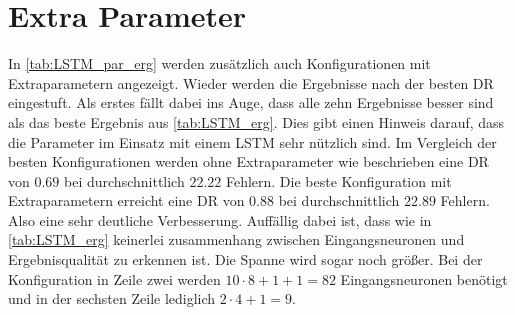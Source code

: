 \section{Extra Parameter}\label{sec:erg_LSTM_extra}
    In \autoref{tab:LSTM_par_erg} werden zusätzlich auch Konfigurationen mit Extraparametern angezeigt. 
    Wieder werden die Ergebnisse nach der besten \ac{DR} eingestuft.
    Als erstes fällt dabei ins Auge, dass alle zehn Ergebnisse besser sind als das beste Ergebnis aus \autoref{tab:LSTM_erg}.
    Dies gibt einen Hinweis darauf, dass die Parameter im Einsatz mit einem \ac{LSTM} sehr nützlich sind.
    Im Vergleich der besten Konfigurationen werden ohne Extraparameter wie beschrieben eine \ac{DR} von $0.69$ bei durchschnittlich $22.22$ Fehlern.
    Die beste Konfiguration mit Extraparametern erreicht eine \ac{DR} von $0.88$ bei durchschnittlich $22.89$ Fehlern.
    Also eine sehr deutliche Verbesserung.
    Auffällig dabei ist, dass wie in \autoref{tab:LSTM_erg} keinerlei zusammenhang zwischen Eingangsneuronen und Ergebnisqualität zu erkennen ist.
    Die Spanne wird sogar noch größer.
    Bei der Konfiguration in Zeile zwei werden $10\cdot8 + 1 + 1=82$ Eingangsneuronen benötigt und in der sechsten Zeile  lediglich $2\cdot4 + 1 = 9$.
